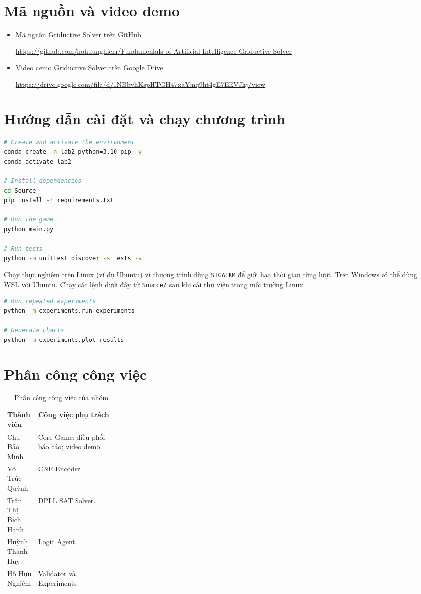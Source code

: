 \section{Mã nguồn và video demo}
\begin{itemize}
    \item Mã nguồn Griductive Solver trên GitHub\par
    \url{https://github.com/hohuunghiem/Fundamentals-of-Artificial-Intelligence-Griductive-Solver}
    \item Video demo Griductive Solver trên Google Drive\par
    \url{https://drive.google.com/file/d/1NBbvhKspHTGH47xaYmq9ht4gE7EEVJkj/view}
\end{itemize}

\section{Hướng dẫn cài đặt và chạy chương trình}
\begin{lstlisting}[language=bash]
# Create and activate the environment
conda create -n lab2 python=3.10 pip -y
conda activate lab2

# Install dependencies
cd Source
pip install -r requirements.txt

# Run the game
python main.py

# Run tests
python -m unittest discover -s tests -v
\end{lstlisting}

Chạy thực nghiệm trên Linux (ví dụ Ubuntu) vì chương trình dùng
\texttt{SIGALRM} để giới hạn thời gian từng lượt. Trên Windows có
thể dùng WSL với Ubuntu. Chạy các lệnh dưới đây từ \texttt{Source/}
sau khi cài thư viện trong môi trường Linux.
\begin{lstlisting}[language=bash]
# Run repeated experiments
python -m experiments.run_experiments

# Generate charts
python -m experiments.plot_results
\end{lstlisting}

\clearpage
\section{Phân công công việc}
\begin{table}[H]\centering
\caption{Phân công công việc của nhóm}
\begin{tabularx}{\linewidth}{|p{0.27\linewidth}|Y|}
\hline
Thành viên & Công việc phụ trách\\\hline
Chu Bảo Minh & Core Game; điều phối báo cáo; video demo.\\\hline
Võ Trúc Quỳnh & CNF Encoder.\\\hline
Trần Thị Bích Hạnh & DPLL SAT Solver.\\\hline
Huỳnh Thanh Huy & Logic Agent.\\\hline
Hồ Hữu Nghiêm & Validator và Experiments.\\\hline
\end{tabularx}
\end{table}

